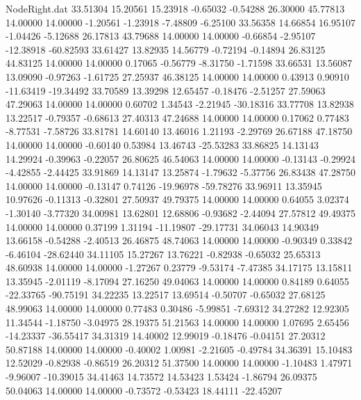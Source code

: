 \begin{filecontents}{NodeRight.dat}
  33.51304   15.20561   15.23918    -0.65032   -0.54288   26.30000   45.77813   14.00000   14.00000   -1.20561   -1.23918   -7.48809   -6.25100
  33.56358   14.66854   16.95107    -1.04426   -5.12688   26.17813   43.79688   14.00000   14.00000   -0.66854   -2.95107  -12.38918  -60.82593
  33.61427   13.82935   14.56779    -0.72194   -0.14894   26.83125   44.83125   14.00000   14.00000    0.17065   -0.56779   -8.31750   -1.71598
  33.66531   13.56087   13.09090    -0.97263   -1.61725   27.25937   46.38125   14.00000   14.00000    0.43913    0.90910  -11.63419  -19.34492
  33.70589   13.39298   12.65457    -0.18476   -2.51257   27.59063   47.29063   14.00000   14.00000    0.60702    1.34543   -2.21945  -30.18316
  33.77708   13.82938   13.22517    -0.79357   -0.68613   27.40313   47.24688   14.00000   14.00000    0.17062    0.77483   -8.77531   -7.58726
  33.81781   14.60140   13.46016     1.21193   -2.29769   26.67188   47.18750   14.00000   14.00000   -0.60140    0.53984   13.46743  -25.53283
  33.86825   14.13143   14.29924    -0.39963   -0.22057   26.80625   46.54063   14.00000   14.00000   -0.13143   -0.29924   -4.42855   -2.44425
  33.91869   14.13147   13.25874    -1.79632   -5.37756   26.83438   47.28750   14.00000   14.00000   -0.13147    0.74126  -19.96978  -59.78276
  33.96911   13.35945   10.97626    -0.11313   -0.32801   27.50937   49.79375   14.00000   14.00000    0.64055    3.02374   -1.30140   -3.77320
  34.00981   13.62801   12.68806    -0.93682   -2.44094   27.57812   49.49375   14.00000   14.00000    0.37199    1.31194  -11.19807  -29.17731
  34.06043   14.90349   13.66158    -0.54288   -2.40513   26.46875   48.74063   14.00000   14.00000   -0.90349    0.33842   -6.46104  -28.62440
  34.11105   15.27267   13.76221    -0.82938   -0.65032   25.65313   48.60938   14.00000   14.00000   -1.27267    0.23779   -9.53174   -7.47385
  34.17175   13.15811   13.35945    -2.01119   -8.17094   27.16250   49.04063   14.00000   14.00000    0.84189    0.64055  -22.33765  -90.75191
  34.22235   13.22517   13.69514    -0.50707   -0.65032   27.68125   48.99063   14.00000   14.00000    0.77483    0.30486   -5.99851   -7.69312
  34.27282   12.92305   11.34544    -1.18750   -3.04975   28.19375   51.21563   14.00000   14.00000    1.07695    2.65456  -14.23337  -36.55417
  34.31319   14.40002   12.99019    -0.18476   -0.04151   27.20312   50.87188   14.00000   14.00000   -0.40002    1.00981   -2.21605   -0.49784
  34.36391   15.10483   12.52029    -0.82938   -0.86519   26.20312   51.37500   14.00000   14.00000   -1.10483    1.47971   -9.96007  -10.39015
  34.41463   14.73572   14.53423     1.53424   -1.86794   26.09375   50.04063   14.00000   14.00000   -0.73572   -0.53423   18.44111  -22.45207

\end{filecontents}
